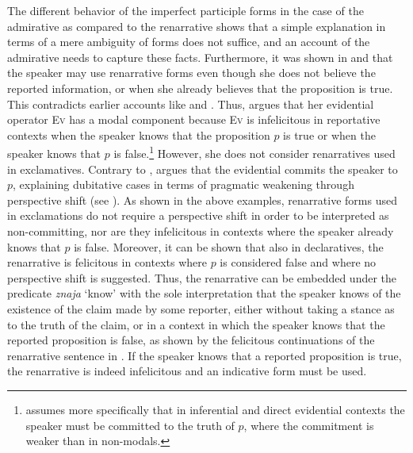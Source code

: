 \documentclass[output=paper,
colorlinks,
citecolor=brown,
newtxmath
]{langscibook}
\begin{document}
\noindent The different behavior of the imperfect participle forms in the case of the admirative as compared to the renarrative shows that a simple explanation in terms of a mere ambiguity of forms
does not suffice, and an account of the admirative needs to capture these facts.
%
%
Furthermore, it was shown in  and  that the speaker may use renarrative forms even though she does not believe the reported information, or when she already believes that the proposition is true.
This contradicts earlier accounts like \citet{Smirnova2013} and \citet{Koev2017}. Thus, \citeauthor{Smirnova2013} argues that her evidential operator \textsc{Ev} has a modal component because \textsc{Ev} is infelicitous in reportative contexts when the speaker knows that the proposition $p$ is true or when the speaker knows that $p$ is false.\footnote{\citeauthor{Smirnova2013} assumes more specifically that in inferential and direct evidential contexts the speaker must be committed to the truth of $p$, where the commitment is weaker than in non-modals.} However, she does not consider renarratives used in exclamatives. Contrary to \citeauthor{Smirnova2013}, \citeauthor{Koev2017} argues that the evidential commits the speaker to $p$, explaining dubitative cases in terms of pragmatic weakening through perspective shift (see \citealt[20-25]{Koev2017}). As shown in the above examples, renarrative forms used in exclamations do not require a perspective shift in order to be interpreted as non-committing, nor are they infelicitous in contexts where the speaker already knows that $p$ is false. Moreover, it can be shown that also in declaratives, the renarrative is felicitous in contexts where $p$ is considered false and where no perspective shift is suggested. Thus, the renarrative can be embedded under the predicate \textit{znaja} `know' with the sole interpretation that the speaker knows of the existence of the claim made by some reporter, either without taking a stance as to the truth of the claim, or in a context in which the speaker knows that the reported proposition is false, as shown by the felicitous continuations of the renarrative sentence in . If the speaker knows that a reported proposition is true, the renarrative is indeed infelicitous and an indicative form must be used.
\end{document}
